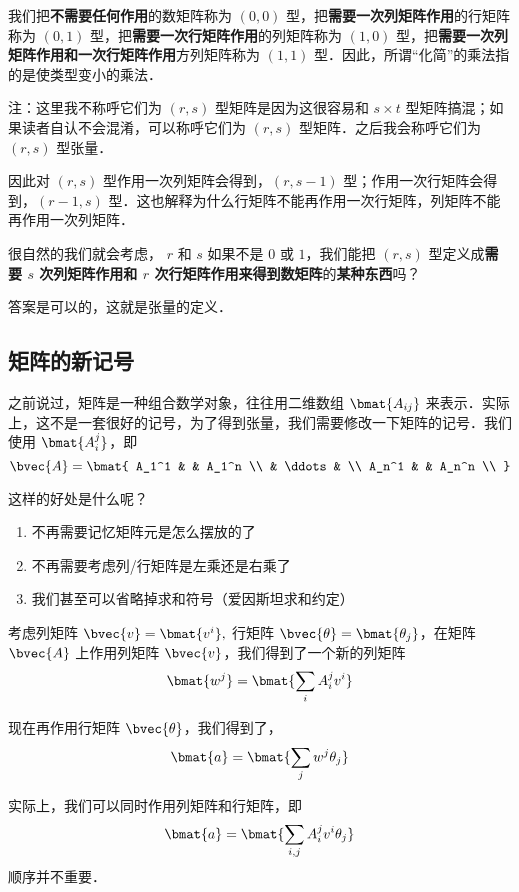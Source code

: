 我们把\textbf{不需要任何作用}的数矩阵称为 $(0,0)$ 型，把\textbf{需要一次列矩阵作用}的行矩阵称为 $(0,1)$ 型，把\textbf{需要一次行矩阵作用}的列矩阵称为 $(1,0)$ 型，把\textbf{需要一次列矩阵作用和一次行矩阵作用}方列矩阵称为 $(1,1)$ 型．因此，所谓“化简”的乘法指的是使类型变小的乘法．

注：这里我不称呼它们为 $(r, s)$ 型矩阵是因为这很容易和 $s \times t$ 型矩阵搞混；如果读者自认不会混淆，可以称呼它们为 $(r, s)$ 型矩阵．之后我会称呼它们为$(r, s)$ 型张量．

因此对 $(r, s)$ 型作用一次列矩阵会得到，$(r, s - 1)$ 型；作用一次行矩阵会得到，$(r - 1, s)$ 型．这也解释为什么行矩阵不能再作用一次行矩阵，列矩阵不能再作用一次列矩阵．

很自然的我们就会考虑， $r$ 和 $s$ 如果不是 $0$ 或 $1$，我们能把 $(r, s)$ 型定义成\textbf{需要 $s$ 次列矩阵作用和 $r$ 次行矩阵作用来得到数矩阵}的\textbf{某种东西}吗？

答案是可以的，这就是张量的定义．

\subsection{矩阵的新记号}

之前说过，矩阵是一种组合数学对象，往往用二维数组 $\bmat{A_{i j}}$ 来表示．实际上，这不是一套很好的记号，为了得到张量，我们需要修改一下矩阵的记号．我们使用 $\bmat{A_i^j}$，即
$$
\bvec{A} = \bmat{
A_1^1 &  & A_1^n \\
 & \ddots & \\
A_n^1 &  & A_n^n \\
}
$$

这样的好处是什么呢？
\begin{enumerate}
\item 不再需要记忆矩阵元是怎么摆放的了
\item 不再需要考虑列/行矩阵是左乘还是右乘了
\item 我们甚至可以省略掉求和符号（爱因斯坦求和约定）
\end{enumerate}


考虑列矩阵 $\bvec{v} = \bmat{v^i},$ 行矩阵 $\bvec{\theta} = \bmat{\theta_j}$，在矩阵 $\bvec{A}$ 上作用列矩阵 $\bvec{v}$，我们得到了一个新的列矩阵
$$
\bmat{w^j} = \bmat{\sum_i A_i^j v^i}
$$

现在再作用行矩阵 $\bvec{\theta}$，我们得到了，
$$
\bmat{a} = \bmat{\sum_j w^j \theta_j}
$$

实际上，我们可以同时作用列矩阵和行矩阵，即
$$
\bmat{a} = \bmat{\sum_{i, j} A_i^j v^i \theta_j}
$$
顺序并不重要．

